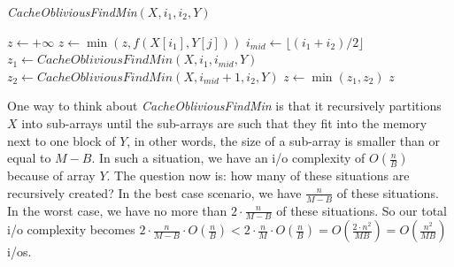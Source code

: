 \documentclass{article}
\newcommand{\io}{{\sc i/o}\xspace}
\newcommand{\ios}{{\io}s\xspace}
\newcounter{rcounter}
\newenvironment{rlist}%
{\begin{list}{\setnr-\arabic{rcounter}}{\usecounter{rcounter}}}{\end{list}}
\begin{document}
\begin{rlist}
\begin{enumerate}
            \emph{CacheObliviousFindMin}$(X, i_1, i_2, Y)$
            \begin{algorithmic}[1]
                \State $z \gets +\infty$
                \State $z \gets \min (z, f(X[i_1],Y[j]) )$
                \EndFor
                \Else
                \State $i_{mid} \gets \lfloor (i_1 + i_2) / 2 \rfloor$
                \State $z_1 \gets CacheObliviousFindMin(X, i_1, i_{mid}, Y)$
                \State $z_2 \gets CacheObliviousFindMin(X, i_{mid} + 1, i_2, Y)$
                \State $z \gets \min (z_1, z_2)$
                \EndIf
                \State \Return $z$
            \end{algorithmic}
            
            One way to think about \emph{CacheObliviousFindMin} is that it recursively partitions $X$ into sub-arrays until the sub-arrays are such that they fit into the memory next to one block of $Y$, in other words, the size of a sub-array is smaller than or equal to $M-B$. In such a situation, we have an \io complexity of $O(\frac{n}{B})$ because of array $Y$. The question now is: how many of these situations are recursively created? In the best case scenario, we have $\frac{n}{M-B}$ of these situations. In the worst case, we have no more than $2 \cdot \frac{n}{M-B}$ of these situations. So our total \io complexity becomes $2 \cdot \frac{n}{M-B} \cdot O(\frac{n}{B}) < 2 \cdot \frac{n}{M} \cdot O(\frac{n}{B}) = O(\frac{2 \cdot n^2}{MB}) = O(\frac{n^2}{MB})$ \ios.
        \end{enumerate}
        
    \end{rlist}
    
    \renewcommand{\setnr}{IO.II}
\end{document}
